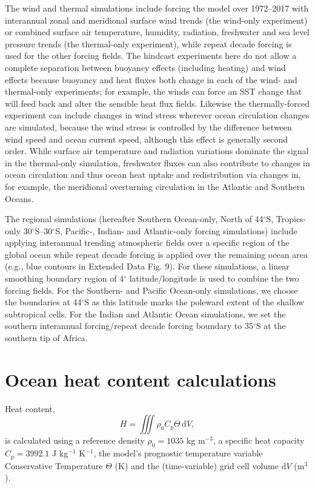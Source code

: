 \documentclass{nature}
\begin{document}
\begin{methods}
		The wind and thermal simulations include forcing the model over 1972--2017 with interannual zonal and meridional surface wind trends (the wind-only experiment) or combined surface air temperature, humidity, radiation, freshwater and sea level pressure trends (the thermal-only experiment), while repeat decade forcing is used for the other forcing fields. The hindcast experiments here do not allow a complete separation between buoyancy effects (including heating) and wind effects because buoyancy and heat fluxes both change in each of  the wind- and thermal-only experiments; for example, the winds can force an SST change that will feed back and alter the sensible heat flux fields. Likewise the thermally-forced experiment can include changes in wind stress wherever ocean circulation changes are simulated, because the wind stress is controlled by the difference between wind speed and ocean current speed, although this effect is generally second order. While surface air temperature and radiation variations dominate the signal in the thermal-only simulation, freshwater fluxes can also contribute to changes in ocean circulation and thus ocean heat uptake and redistribution via changes in, for example, the meridional overturning circulation in the Atlantic and Southern Oceans\cite{Winton2013connecting,gregory2016FAFMIP}.
		
		The regional simulations (hereafter Southern Ocean-only, North of 44$^{\circ}$S, Tropics-only 30$^{\circ}$S--30$^{\circ}$S, Pacific-, Indian- and Atlantic-only forcing simulations) include applying interannual trending atmospheric fields over a specific region of the global ocean while repeat decade forcing is applied over the remaining ocean area (e.g., blue contours in Extended Data Fig. 9). For these simulations, a linear smoothing boundary region of 4$^{\circ}$ latitude/longitude is used to combine the two forcing fields. For the Southern- and Pacific Ocean-only simulations, we choose the boundaries at 44$^{\circ}$S as this latitude marks the poleward extent of the shallow subtropical cells. For the Indian and Atlantic Ocean simulations, we set the southern interannual forcing/repeat decade forcing boundary to 35$^{\circ}$S at the southern tip of Africa.
		
		\section*{Ocean heat content calculations}
		Heat content, 
		\begin{equation}
		H = \iiint\rho_0 C_p \Theta \,\mathrm{d}V,
		\end{equation}
		is calculated using a reference density $\rho_0 = 1035$ kg m$^{-3}$, a specific heat capacity $C_p = 3992.1$ J kg$^{-1}$ K$^{-1}$, the model's prognostic temperature variable Conservative Temperature $\Theta$\cite{McDougall2003enthalpy,TEOS10} (K) and the (time-variable) grid cell volume $\mathrm{d}V$ (m$^{3}$). 
		

\end{methods}
\end{document}
